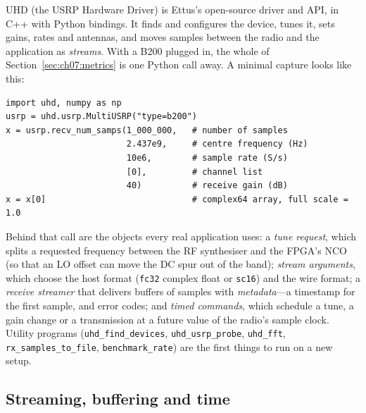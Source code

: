 UHD (the USRP Hardware Driver) is Ettus's open-source driver and API, in C++ with Python bindings. It
finds and configures the device, tunes it, sets gains, rates and antennas, and moves samples between the
radio and the application as \emph{streams}. With a B200 plugged in, the whole of
Section~\ref{sec:ch07:metrics} is one Python call away. A minimal capture looks like this:
\begin{lstlisting}
import uhd, numpy as np
usrp = uhd.usrp.MultiUSRP("type=b200")
x = usrp.recv_num_samps(1_000_000,   # number of samples
                        2.437e9,     # centre frequency (Hz)
                        10e6,        # sample rate (S/s)
                        [0],         # channel list
                        40)          # receive gain (dB)
x = x[0]                             # complex64 array, full scale = 1.0
\end{lstlisting}
Behind that call are the objects every real application uses: a \emph{tune request}, which splits a
requested frequency between the RF synthesiser and the FPGA's NCO (so that an LO offset can move the DC
spur out of the band); \emph{stream arguments}, which choose the host format (\texttt{fc32} complex float
or \texttt{sc16}) and the wire format; a \emph{receive streamer} that delivers buffers of samples with
\emph{metadata}---a timestamp for the first sample, and error codes; and \emph{timed commands}, which
schedule a tune, a gain change or a transmission at a future value of the radio's sample clock. Utility
programs (\texttt{uhd\_find\_devices}, \texttt{uhd\_usrp\_probe}, \texttt{uhd\_fft},
\texttt{rx\_samples\_to\_file}, \texttt{benchmark\_rate}) are the first things to run on a new setup.

\subsection{Streaming, buffering and time}

